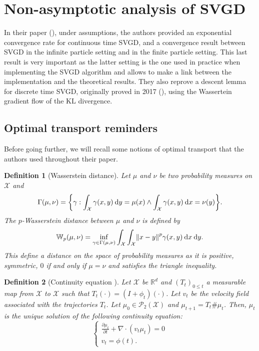 \documentclass{article}
\newcommand{\R}{\mathbb{R}}
\newcommand{\E}{\mathbb{E}}
\newcommand{\X}{\mathcal{X}}
\renewcommand{\P}{\mathcal{P}}
\newcommand{\KL}{\mathrm{KL}}
\newcommand{\W}{\mathbb{W}}
\newcommand{\diff}[2]{\frac{\partial #1}{\partial #2}}
\renewcommand{\d}{\: \mathrm{d}}
\DeclarePairedDelimiter{\norm}{\|}{\|}
\DeclarePairedDelimiter{\bra}{\{}{\}}
\newtheorem{definition}{Definition}
\begin{document}

\section{Non-asymptotic analysis of SVGD}
In their paper (\cite{main-paper}), under assumptions, the authors provided
an exponential convergence rate for continuous time SVGD, and
a convergence result between SVGD in the infinite particle setting
and in the finite particle setting.
This last result is very important as the latter
setting is the one used in practice
when implementing the SVGD algorithm and allows to
make a link between the implementation and the theoretical
results.
They also reprove a descent lemma for discrete time SVGD, originally
proved in 2017 (\cite{SVGD-flow}), using the Wassertein gradient
flow of the $\KL$ divergence.


\subsection{Optimal transport reminders}
Before going further, we will recall some notions of optimal transport
that the authors used throughout their paper.\\

\begin{definition}[Wasserstein distance]
  Let $\mu$ and $\nu$ be two probability measures on $\X$ and
  $$
    \Gamma (\mu, \nu) = \bra*{\gamma : \int_\X \gamma(x, y) \d y = \mu(x)
    \land \int_\X \gamma(x, y) \d x = \nu(y)}.
  $$
  The $p$-Wasserstein distance between $\mu$ and $\nu$ is defined by
  $$
    \W_p(\mu, \nu) = \inf_{\gamma \in \Gamma(\mu, \nu)} \int_\X \int_\X
    \norm*{x-y}^p \gamma(x, y) \d x \d y.
  $$
  This define a distance on the space of probability measures as it is
  positive, symmetric, $0$ if and only if $\mu = \nu$ and satisfies
  the triangle inequality.
\end{definition}

\begin{definition}[Continuity equation \cite{villani2003}]\label{def:continuity-equation}
  Let $\X$ be $\R^d$ and $(T_t)_{0 \leq t}$ a measurable map from $\X$ to $\X$
  such that $T_t(\cdot) = (I + \phi_t)(\cdot)$.
  Let $v_t$ be the velocity field associated 
  with the trajectories $T_t$. Let $\mu_0 \in \P_2(\X)$
  and $\mu_{t+1} = T_t \# \mu_t$. Then, $\mu_t$ is the unique solution
  of the following continuity equation:
  $$
  \begin{cases}
    \diff{\mu_t}{t} + \nabla \cdot (v_t \mu_t) = 0 \\
    v_t = \phi(t).
  \end{cases}
  $$
  
\end{definition}
\end{document}
